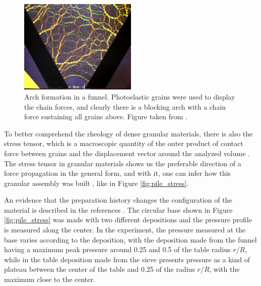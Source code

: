 \begin{figure}
    \centering
    \includegraphics[width=0.5\textwidth]{04-figuras/hopperforcechain.jpg}
    \caption[Arch in a funnel.]{Arch formation in a funnel. Photoelastic grains were used to display the chain forces, and clearly there is a blocking arch with a chain force sustaining all grains above. Figure taken from \cite{Duke_Physics}.}
    \label{fig:arch_chain}
\end{figure}

    To better comprehend the rheology of dense granular materials, there is also the stress tensor, which is a macroscopic quantity of the outer product of contact force between grains and the displacement vector around the analyzed volume \cite{Granular_Physics, Nathalia-Dissertacao, Leticia-Dissertacao, Fabiola-Dissertacao, Force_Chains_Micro_Macro}. The stress tensor in granular materials shows us the preferable direction of a force propagation in the general form, and with it, one can infer how this granular assembly was built \cite{Memories_in_Sand}, like in Figure \ref{fig:pile_stress}.


    An evidence that the preparation history changes the configuration of the material is described in the references \cite{Memories_in_Sand, Sensitivity_of_Stress_Response_Function_to_Packing_Preparation}. The circular base shown in Figure \ref{fig:pile_stress} was made with two different depositions and the pressure profile is measured along the center. In the experiment, the pressure measured at the base varies according to the deposition, with the deposition made from the funnel having a maximum peak pressure around 0.25 and 0.5 of the table radius $r/R$, while in the table deposition made from the sieve presents pressure as a kind of plateau between the center of the table and 0.25 of the radius $r/R$, with the maximum close to the center.

